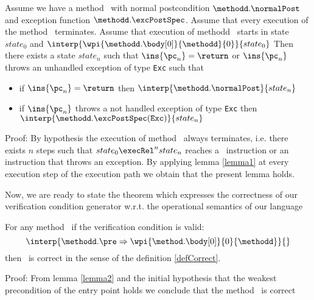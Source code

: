 \begin{lemma2}\label{lemma2}
Assume we have a method \methodd \ with normal postcondition  $\methodd.\normalPost$ and exception function $\methodd.\excPostSpec$. 
Assume that every execution of the method \methodd \ terminates.
 Assume that  execution of methodd \methodd \ starts in state $state_0$ 
and $\interp{ \wpi{\methodd.\body[0] } {\methodd}{0}}{ state_0}$
Then there exists a state $state_n$ such that $\ins{\pc_n} = \return $ or $\ins{\pc_n}$ throws an unhandled 
exception of type \mbox{\rm\texttt{Exc}} such that
\begin{itemize}
    \item if $\ins{\pc_n} = \return $ then $\interp{ \methodd.\normalPost}{state_n}$
    \item  if $\ins{\pc_n}$ throws a not handled exception of type \texttt{Exc} then 
             $\interp{ \methodd.\excPostSpec(\mbox{\rm\texttt{Exc}}  )}{state_n}$
\end{itemize}
\end{lemma2}
Proof: 
By hypothesis the execution of method \methodd \ always terminates, i.e. there exists $n$ steps such that
$ state_0 \execRel^n state_n$ reaches a \return \ instruction or an instruction that throws an exception.
By applying lemma \ref{lemma1} at every execution step of the execution path we obtain that the present lemma holds.



Now, we are ready to state the theorem which expresses the correctness of our verification condition generator
w.r.t. the operational semantics of our language
\begin{vcGenCorrect}\label{vcGenCorrect}
For any  method \methodd \  if the verification condition is valid:
$$ \interp{\methodd.\pre \Rightarrow \wpi{\method.\body[0]}{0}{\methodd}}{} $$
 then \methodd \ is correct in the sense of the definition \ref{defCorrect}. 
\end{vcGenCorrect}
Proof: From lemma \ref{lemma2} and the initial hypothesis that the weakest precondition of the 
entry point holds we conclude that the method \methodd \ is correct
